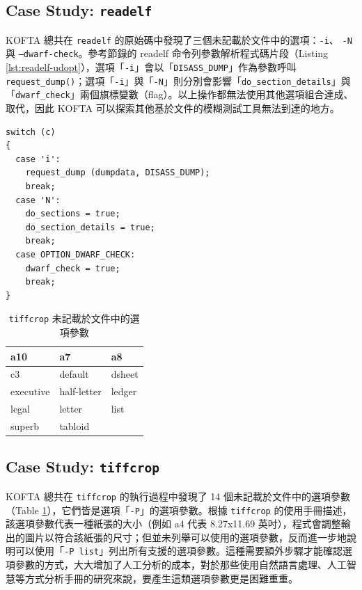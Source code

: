 \subsection{Case Study: \texttt{readelf}}
\label{subsec:rq1-case-readelf}

KOFTA 總共在 \texttt{readelf} 的原始碼中發現了三個未記載於文件中的選項：\texttt{-i}、 \texttt{-N} 與 \texttt{--dwarf-check}。參考節錄的 readelf 命令列參數解析程式碼片段（Listing \ref{lst:readelf-udopt}），選項「\texttt{-i}」會以「\texttt{DISASS\_DUMP}」作為參數呼叫 \texttt{request\_dump()}；選項「\texttt{-i}」與「\texttt{-N}」則分別會影響「\texttt{do\_section\_details}」與「\texttt{dwarf\_check}」兩個旗標變數（flag）。以上操作都無法使用其他選項組合達成、取代，因此 KOFTA 可以探索其他基於文件的模糊測試工具無法到達的地方。

\begin{lstlisting}[caption=\texttt{readelf} 解析未記載於文件中的選項, label=lst:readelf-udopt]
switch (c)
{
  case 'i':
    request_dump (dumpdata, DISASS_DUMP);
    break;
  case 'N':
    do_sections = true;
    do_section_details = true;
    break;
  case OPTION_DWARF_CHECK:
    dwarf_check = true;
    break;
}
\end{lstlisting}

\vfill

\begin{table}[hb]
    \centering
    \begin{tabularx}{0.8\textwidth} {
        | >{\ttfamily\centering\arraybackslash}X
        | >{\ttfamily\centering\arraybackslash}X
        | >{\ttfamily\centering\arraybackslash}X | }
        \hline
        a10 & a7 & a8\\
        \hline
        c3 & default & dsheet\\
        \hline
        executive & half-letter & ledger\\
        \hline
        legal & letter & list\\
        \hline
        superb & tabloid & \\
        \hline
    \end{tabularx}
    \caption{\texttt{tiffcrop} 未記載於文件中的選項參數}
    \label{tab:tiffcrop-udoptarg}
\end{table}

\subsection{Case Study: \texttt{tiffcrop}}

KOFTA 總共在 \texttt{tiffcrop} 的執行過程中發現了 14 個未記載於文件中的選項參數（Table \ref{tab:tiffcrop-udoptarg}），它們皆是選項「\texttt{-P}」的選項參數。根據 \texttt{tiffcrop} 的使用手冊描述，該選項參數代表一種紙張的大小（例如 a4 代表 8.27x11.69 英吋），程式會調整輸出的圖片以符合該紙張的尺寸；但並未列舉可以使用的選項參數，反而進一步地說明可以使用「\texttt{-P list}」列出所有支援的選項參數。這種需要額外步驟才能確認選項參數的方式，大大增加了人工分析的成本，對於那些使用自然語言處理、人工智慧等方式分析手冊的研究來說，要產生這類選項參數更是困難重重。

